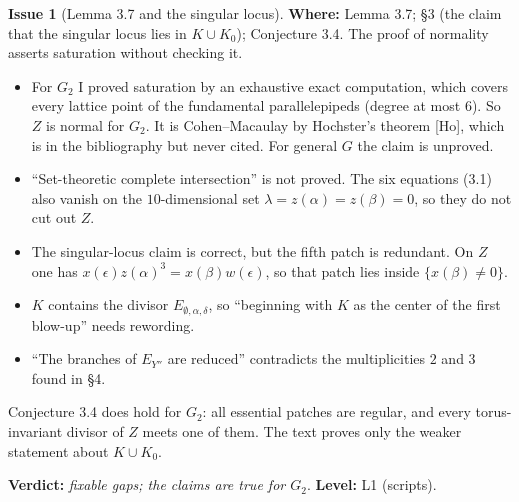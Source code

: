\documentclass[12pt,letterpaper]{article}
\newcommand{\Lv}[1]{\textsf{L#1}}
\newcommand{\verdict}[1]{\textbf{Verdict:} \emph{#1}.}
\newcommand{\level}[1]{\textbf{Level:} #1.}
\newcommand{\loc}[1]{\textbf{Where:} #1.}
\theoremstyle{definition}
\newtheorem{issue}{Issue}[section]
\begin{document}
\begin{issue}[Lemma 3.7 and the singular locus]\label{iss:normal}
\loc{Lemma 3.7; \S3 (the claim that the singular locus lies in $K\cup K_0$);
Conjecture 3.4}
The proof of normality asserts saturation without checking it.
\begin{itemize}
\item For $G_2$ I proved saturation by an exhaustive exact computation, which
covers every lattice point of the fundamental parallelepipeds (degree at most
$6$). So $Z$ is normal for $G_2$. It is Cohen--Macaulay by Hochster's theorem
[Ho], which is in the bibliography but never cited. For general $G$ the claim
is unproved.
\item ``Set-theoretic complete intersection'' is not proved. The six equations
(3.1) also vanish on the $10$-dimensional set $\lambda=z(\alpha)=z(\beta)=0$,
so they do not cut out $Z$.
\item The singular-locus claim is correct, but the fifth patch is redundant.
On $Z$ one has $x(\epsilon)z(\alpha)^3=x(\beta)w(\epsilon)$, so that patch lies
inside $\{x(\beta)\ne0\}$.
\item $K$ contains the divisor $E_{\emptyset,\alpha,\delta}$, so ``beginning
with $K$ as the center of the first blow-up'' needs rewording.
\item ``The branches of $E_{Y''}$ are reduced'' contradicts the multiplicities
$2$ and $3$ found in \S4.
\end{itemize}
Conjecture 3.4 does hold for $G_2$: all essential patches are regular, and
every torus-invariant divisor of $Z$ meets one of them. The text proves only
the weaker statement about $K\cup K_0$.

\verdict{fixable gaps; the claims are true for $G_2$}
\level{\Lv{1} (scripts)}
\end{issue}
\end{document}
